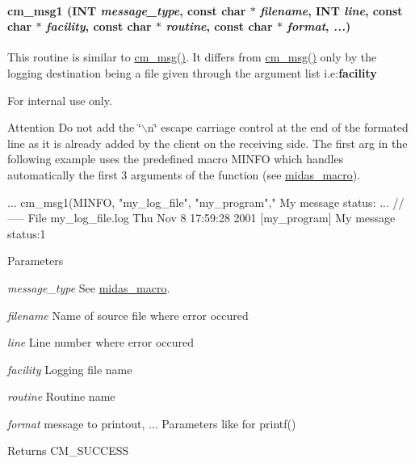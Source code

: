 \paragraph[{cm\_\-msg1}]{ cm\_\-msg1 ({\bf INT} {\em message\_\-type}, \/  const char $\ast$ {\em filename}, \/  {\bf INT} {\em line}, \/  const char $\ast$ {\em facility}, \/  const char $\ast$ {\em routine}, \/  const char $\ast$ {\em format}, \/   {\em ...})}\hfill\label{group__msgfunctionc_ga2dcad358d4ad50963cf2f34c56201f62}
This routine is similar to \hyperlink{group__msgfunctionc_gaac032ca2438c47466bfc9722de6746ea}{cm\_\-msg()}. It differs from \hyperlink{group__msgfunctionc_gaac032ca2438c47466bfc9722de6746ea}{cm\_\-msg()} only by the logging destination being a file given through the argument list i.e:{\bfseries facility} \begin{DoxyInternal}{For internal use only.}
\begin{DoxyAttention}{Attention}
Do not add the \char`\"{}$\backslash$n\char`\"{} escape carriage control at the end of the formated line as it is already added by the client on the receiving side. The first arg in the following example uses the predefined macro MINFO which handles automatically the first 3 arguments of the function (see \hyperlink{F_Midas_Code_and_Libraries_midas_macro}{midas\_\-macro}). 
\begin{DoxyCode}
 ...
   cm_msg1(MINFO, "my_log_file", "my_program"," My message status:%
   ...
//----- File my_log_file.log
Thu Nov  8 17:59:28 2001 [my_program] My message status:1
\end{DoxyCode}
 
\end{DoxyAttention}

\begin{DoxyParams}{Parameters}
\item[{\em message\_\-type}]See \hyperlink{F_Midas_Code_and_Libraries_midas_macro}{midas\_\-macro}. \item[{\em filename}]Name of source file where error occured \item[{\em line}]Line number where error occured \item[{\em facility}]Logging file name \item[{\em routine}]Routine name \item[{\em format}]message to printout, ... Parameters like for printf() \end{DoxyParams}
\begin{DoxyReturn}{Returns}
CM\_\-SUCCESS 
\end{DoxyReturn}
\end{DoxyInternal}


